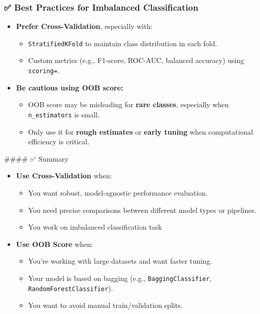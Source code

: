 \documentclass[
  letterpaper,
  DIV=11,
  numbers=noendperiod]{scrreprt}
\providecommand{\tightlist}{%
  \setlength{\itemsep}{0pt}\setlength{\parskip}{0pt}}\usepackage{longtable,booktabs,array}
\begin{document}
\subsubsection{✅ Best Practices for Imbalanced
Classification}\label{best-practices-for-imbalanced-classification}

\begin{itemize}
\tightlist
\item
  \textbf{Prefer Cross-Validation}, especially with:

  \begin{itemize}
  \tightlist
  \item
    \texttt{StratifiedKFold} to maintain class distribution in each
    fold.
  \item
    Custom metrics (e.g., F1-score, ROC-AUC, balanced accuracy) using
    \texttt{scoring=}.
  \end{itemize}
\item
  \textbf{Be cautious using OOB score:}

  \begin{itemize}
  \tightlist
  \item
    OOB score may be misleading for \textbf{rare classes}, especially
    when \texttt{n\_estimators} is small.
  \item
    Only use it for \textbf{rough estimates} or \textbf{early tuning}
    when computational efficiency is critical.
  \end{itemize}
\end{itemize}

\#\#\#\# ✅ Summary

\begin{itemize}
\tightlist
\item
  \textbf{Use Cross-Validation} when:

  \begin{itemize}
  \tightlist
  \item
    You want robust, model-agnostic performance evaluation.
  \item
    You need precise comparisons between different model types or
    pipelines.
  \item
    You work on imbalanced classification task
  \end{itemize}
\item
  \textbf{Use OOB Score} when:

  \begin{itemize}
  \tightlist
  \item
    You're working with large datasets and want faster tuning.
  \item
    Your model is based on bagging (e.g., \texttt{BaggingClassifier},
    \texttt{RandomForestClassifier}).
  \item
    You want to avoid manual train/validation splits.
  \end{itemize}
\end{itemize}
\end{document}
